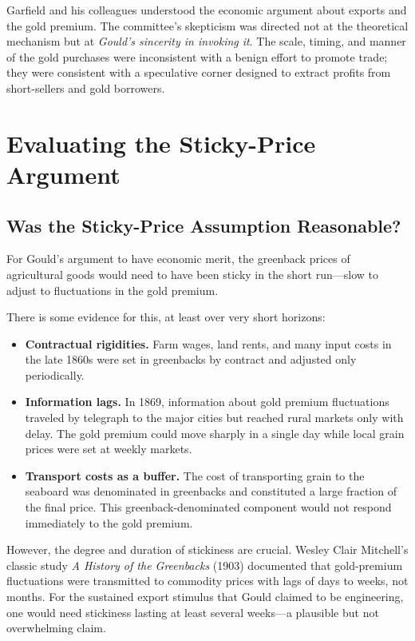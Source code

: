 \documentclass[12pt]{article}
\begin{document}
Garfield and his colleagues understood the economic argument about 
exports and the gold premium. The committee's skepticism was directed not 
at the theoretical mechanism but at \emph{Gould's sincerity in invoking 
it}. The scale, timing, and manner of the gold purchases were 
inconsistent with a benign effort to promote trade; they were consistent 
with a speculative corner designed to extract profits from short-sellers 
and gold borrowers.

\section{Evaluating the Sticky-Price Argument}

\subsection{Was the Sticky-Price Assumption Reasonable?}

For Gould's argument to have economic merit, the greenback prices of 
agricultural goods would need to have been sticky in the short run---slow 
to adjust to fluctuations in the gold premium.

There is some evidence for this, at least over very short horizons:
\begin{itemize}
    \item \textbf{Contractual rigidities.} Farm wages, land rents, and 
    many input costs in the late 1860s were set in greenbacks by 
    contract and adjusted only periodically.
    \item \textbf{Information lags.} In 1869, information about gold 
    premium fluctuations traveled by telegraph to the major cities but 
    reached rural markets only with delay. The gold premium could move 
    sharply in a single day while local grain prices were set at weekly 
    markets.
    \item \textbf{Transport costs as a buffer.} The cost of 
    transporting grain to the seaboard was denominated in greenbacks 
    and constituted a large fraction of the final price. This 
    greenback-denominated component would not respond immediately to 
    the gold premium.
\end{itemize}

However, the degree and duration of stickiness are crucial. 
Wesley Clair Mitchell's classic study \emph{A History of the Greenbacks} 
(1903) documented that gold-premium fluctuations were transmitted to 
commodity prices with lags of days to weeks, not months. For the 
sustained export stimulus that Gould claimed to be engineering, one 
would need stickiness lasting at least several weeks---a plausible but 
not overwhelming claim.
\end{document}
